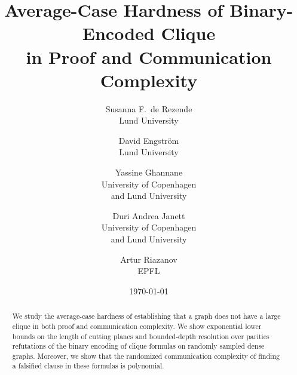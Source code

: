 \documentclass[11pt]{article}
\begin{document}
\title{
Average-Case Hardness of Binary-Encoded Clique \\in Proof and Communication Complexity}
\author{Susanna F.\ de Rezende \\
  Lund University
  \and
  David Engström  \\
  Lund University
  \and  
  Yassine Ghannane \\
  University of Copenhagen \\and Lund University
  \and
  Duri Andrea Janett \\
  University of Copenhagen \\
  and Lund University
  \and
  Artur Riazanov\\
  EPFL}
\date{\today}

\maketitle

\begin{abstract}
    We study the average-case hardness of establishing that a graph does not have a large clique in both proof and communication complexity.
    We show exponential lower bounds on the length of cutting planes and 
    bounded-depth resolution over parities 
    refutations 
    of the binary encoding of clique formulas on randomly sampled dense graphs. 
    Moreover, we show that  
    the randomized communication complexity of 
    finding a falsified clause in these formulas 
    is polynomial.
\end{abstract}

\thispagestyle{empty}
\newpage
{}
{}{\tableofcontents}


\newpage











 
\end{document}
